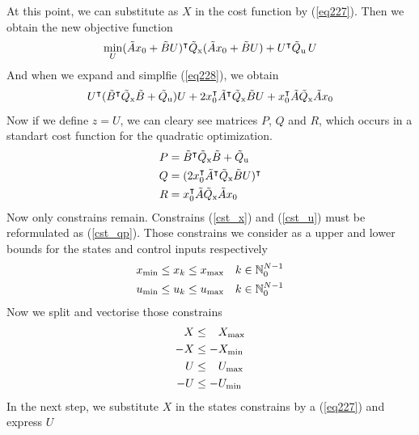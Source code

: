At this point, we can substitute as $X$ in the cost function by (\ref{eq227}). Then we obtain the new objective function
\begin{equation}\label{eq228}
	\min_{U} (\tilde{A}x_0 + \tilde{B}U)^\intercal\tilde{Q} _{\text{x}}(\tilde{A}x_0 + \tilde{B}U) + U^\intercal\tilde{Q} _{\text{u}}\,U\\
\end{equation}
And when we expand and simplfie (\ref{eq228}), we obtain
\begin{equation}
	U^\intercal(\tilde{B}^\intercal\tilde{Q} _{\text{x}}\tilde{B} + \tilde{Q} _{\text{u}})U + 2x_0^\intercal\tilde{A}^\intercal\tilde{Q} _{\text{x}}\tilde{B}U + x_0^\intercal\tilde{A}\tilde{Q} _{\text{x}}\tilde{A}x_0
\end{equation}
Now if we define $z = U$, we can cleary see matrices $P$, $Q$ and $R$, which occurs in a standart cost function for the quadratic optimization.
\begin{subequations}
	\begin{align}
		P &= \tilde{B}^\intercal\tilde{Q} _{\text{x}}\tilde{B} + \tilde{Q} _{\text{u}}\\
		Q &= (2x_0^\intercal\tilde{A}^\intercal\tilde{Q} _{\text{x}}\tilde{B}U)^\intercal\\
		R &= x_0^\intercal\tilde{A}\tilde{Q} _{\text{x}}\tilde{A}x_0
	\end{align}
\end{subequations}
Now only constrains remain. Constrains (\ref{cst_x}) and (\ref{cst_u}) must be reformulated as (\ref{cst_qp}). Those constrains we consider as a upper and lower bounds for the states and control inputs respectively
\begin{subequations}
	\begin{align}
		x _{\text{min}} &\leq x_k \leq x _{\text{max}} \quad k \in \mathbb{N}_0^{N-1}\\
		u _{\text{min}} &\leq u_k \leq u _{\text{max}} \quad k \in \mathbb{N}_0^{N-1}
	\end{align}
\end{subequations}
Now we split and vectorise those constrains
\begin{subequations}
\begin{align}
	X &\leq \ \; \, X _{\text{max}}\\
	-X &\leq -X _{\text{min}}\\
	U &\leq \ \; \, U _{\text{max}}\\
	-U &\leq -U _{\text{min}}
\end{align}
\end{subequations}
In the next step, we substitute $X$ in the states constrains by a (\ref{eq227}) and express $U$
